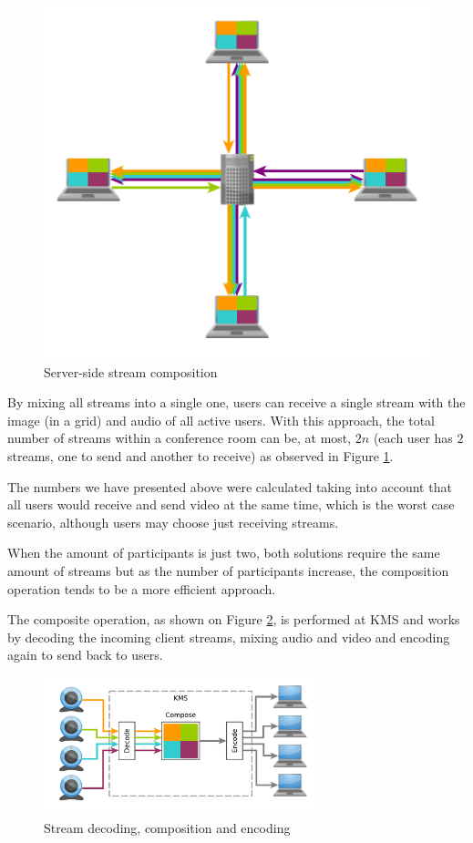\begin{figure}
\begin{minipage}[b]{0.45\linewidth}
	\includegraphics[width=\textwidth]{figures/ecomposite.pdf}
		\caption{Server-side stream composition}
	\label{fig:ecomposite}
\end{minipage}
\end{figure}


		By mixing all streams into a single one, users can receive a single stream with the image (in a grid) and audio of all active users. With this approach, the total number of streams within a conference room can be, at most, $2n$ (each user has $2$ streams, one to send and another to receive) as observed in Figure \ref{fig:ecomposite}.

		The numbers we have presented above were calculated taking into account that all users would receive and send video at the same time, which is the worst case scenario, although users may choose just receiving streams.

		When the amount of participants is just two, both solutions require the same amount of streams but as the number of participants increase, the composition operation tends to be a more efficient approach. 

		The composite operation, as shown on Figure \ref{fig:wcomposite}, is performed at \ac{KMS} and works by decoding the incoming client streams, mixing audio and video and encoding again to send back to users.

	\begin{figure}
		\centering
		\includegraphics[width=0.7\textwidth]{figures/wcomposite.pdf}
		\caption{Stream decoding, composition and encoding}
		\label{fig:wcomposite}
	\end{figure}


